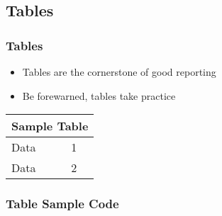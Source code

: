 \documentclass{beamer}
\begin{document}
\subsection{Tables}
\begin{frame}
  \frametitle{Tables}
  \begin{itemize}
  \item Tables are the cornerstone of good reporting
  \item Be forewarned, tables take practice
  \end{itemize}
  \begin{table}
    \centering
    \begin{tabular}{|l|l|}
      \hline
      \multicolumn{2}{|c|}{Sample Table} \\
      \hline
      Data & 1 \\
      Data & 2 \\
      \hline
    \end{tabular}
  \end{table}
\end{frame}

\begin{frame}
  \frametitle{Table Sample Code}  
    
\end{frame}
\end{document}
